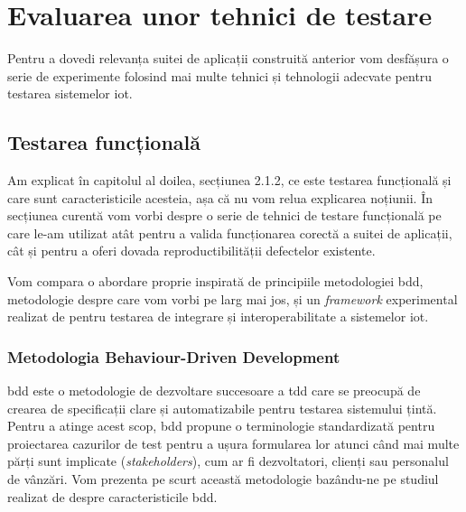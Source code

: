 \chapter{Evaluarea unor tehnici de testare}

Pentru a dovedi relevanța suitei de aplicații construită anterior vom desfășura o serie de experimente folosind mai multe tehnici și tehnologii adecvate pentru testarea sistemelor \acrshort{iot}. 



\section{Testarea funcțională}

Am explicat în capitolul al doilea, secțiunea 2.1.2, ce este testarea funcțională și care sunt caracteristicile acesteia, așa că nu vom relua explicarea noțiunii. În secțiunea curentă vom vorbi despre o serie de tehnici de testare funcțională pe care le-am utilizat atât pentru a valida funcționarea corectă a suitei de aplicații, cât și pentru a oferi dovada reproductibilității defectelor existente.

Vom compara o abordare proprie inspirată de principiile metodologiei \acrfull{bdd}, metodologie despre care vom vorbi pe larg mai jos, și un \textit{framework} experimental realizat de \citet{Bures2021} pentru testarea de integrare și interoperabilitate a sistemelor \acrshort{iot}.

\subsection{Metodologia Behaviour-Driven Development}


\acrfull{bdd} este o metodologie de dezvoltare succesoare a \acrfull{tdd} care se preocupă de crearea de specificații clare și automatizabile pentru testarea sistemului țintă. Pentru a atinge acest scop, \acrshort{bdd} propune o terminologie standardizată pentru proiectarea cazurilor de test pentru a ușura formularea lor atunci când mai multe părți sunt implicate (\textit{stakeholders}), cum ar fi dezvoltatori, clienți sau personalul de vânzări. Vom prezenta pe scurt această metodologie bazându-ne pe studiul realizat de \citet{Solis2011} despre caracteristicile \acrshort{bdd}.

